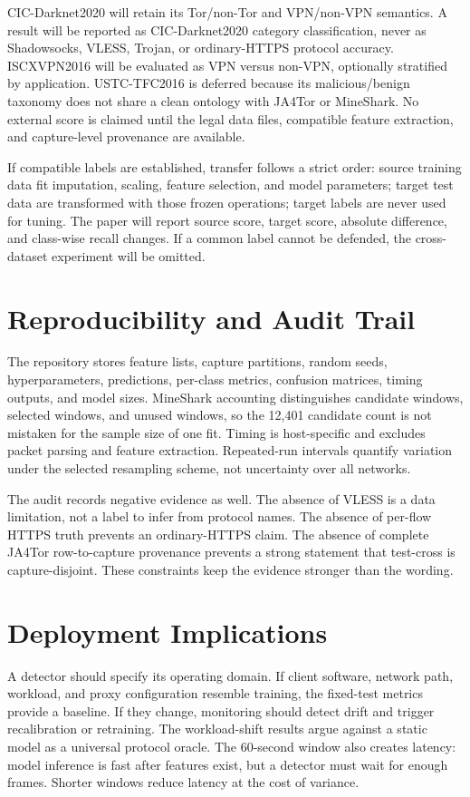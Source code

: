 \documentclass[conference]{IEEEtran}
\begin{document}
CIC-Darknet2020 will retain its Tor/non-Tor and VPN/non-VPN semantics. A result will be reported as CIC-Darknet2020 category classification, never as Shadowsocks, VLESS, Trojan, or ordinary-HTTPS protocol accuracy. ISCXVPN2016 will be evaluated as VPN versus non-VPN, optionally stratified by application. USTC-TFC2016 is deferred because its malicious/benign taxonomy does not share a clean ontology with JA4Tor or MineShark. No external score is claimed until the legal data files, compatible feature extraction, and capture-level provenance are available.

If compatible labels are established, transfer follows a strict order: source training data fit imputation, scaling, feature selection, and model parameters; target test data are transformed with those frozen operations; target labels are never used for tuning. The paper will report source score, target score, absolute difference, and class-wise recall changes. If a common label cannot be defended, the cross-dataset experiment will be omitted.

\section{Reproducibility and Audit Trail}
The repository stores feature lists, capture partitions, random seeds, hyperparameters, predictions, per-class metrics, confusion matrices, timing outputs, and model sizes. MineShark accounting distinguishes candidate windows, selected windows, and unused windows, so the 12,401 candidate count is not mistaken for the sample size of one fit. Timing is host-specific and excludes packet parsing and feature extraction. Repeated-run intervals quantify variation under the selected resampling scheme, not uncertainty over all networks.

The audit records negative evidence as well. The absence of VLESS is a data limitation, not a label to infer from protocol names. The absence of per-flow HTTPS truth prevents an ordinary-HTTPS claim. The absence of complete JA4Tor row-to-capture provenance prevents a strong statement that test-cross is capture-disjoint. These constraints keep the evidence stronger than the wording.

\section{Deployment Implications}
A detector should specify its operating domain. If client software, network path, workload, and proxy configuration resemble training, the fixed-test metrics provide a baseline. If they change, monitoring should detect drift and trigger recalibration or retraining. The workload-shift results argue against a static model as a universal protocol oracle. The 60-second window also creates latency: model inference is fast after features exist, but a detector must wait for enough frames. Shorter windows reduce latency at the cost of variance.
\end{document}
